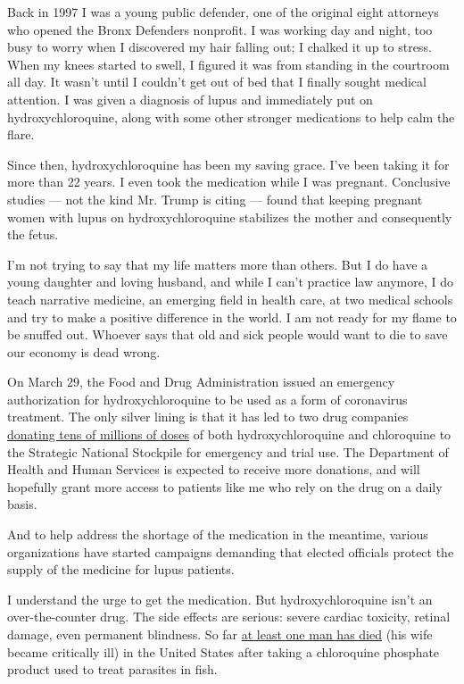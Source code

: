 Back in 1997 I was a young public defender, one of the original eight
attorneys who opened the Bronx Defenders nonprofit. I was working day
and night, too busy to worry when I discovered my hair falling out; I
chalked it up to stress. When my knees started to swell, I figured it
was from standing in the courtroom all day. It wasn't until I couldn't
get out of bed that I finally sought medical attention. I was given a
diagnosis of lupus and immediately put on hydroxychloroquine, along with
some other stronger medications to help calm the flare.

Since then, hydroxychloroquine has been my saving grace. I've been
taking it for more than 22 years. I even took the medication while I was
pregnant. Conclusive studies --- not the kind Mr. Trump is citing ---
found that keeping pregnant women with lupus on hydroxychloroquine
stabilizes the mother and consequently the fetus.

I'm not trying to say that my life matters more than others. But I do
have a young daughter and loving husband, and while I can't practice law
anymore, I do teach narrative medicine, an emerging field in health
care, at two medical schools and try to make a positive difference in
the world. I am not ready for my flame to be snuffed out. Whoever says
that old and sick people would want to die to save our economy is dead
wrong.

On March 29, the Food and Drug Administration issued an emergency
authorization for hydroxychloroquine to be used as a form of coronavirus
treatment. The only silver lining is that it has led to two drug
companies
\href{https://www.hhs.gov/about/news/2020/03/29/hhs-accepts-donations-of-medicine-to-strategic-national-stockpile-as-possible-treatments-for-covid-19-patients.html}{donating
tens of millions of doses} of both hydroxychloroquine and chloroquine to
the Strategic National Stockpile for emergency and trial use. The
Department of Health and Human Services is expected to receive more
donations, and will hopefully grant more access to patients like me who
rely on the drug on a daily basis.

And to help address the shortage of the medication in the meantime,
various organizations have started campaigns demanding that elected
officials protect the supply of the medicine for lupus patients.

I understand the urge to get the medication. But hydroxychloroquine
isn't an over-the-counter drug. The side effects are serious: severe
cardiac toxicity, retinal damage, even permanent blindness. So far
\href{https://couriernewsroom.com/2020/03/23/arizona-man-dies-drug-trump-touted-coronavirus-cure/}{at
least one man has died} (his wife became critically ill) in the United
States after taking a chloroquine phosphate product used to treat
parasites in fish.

